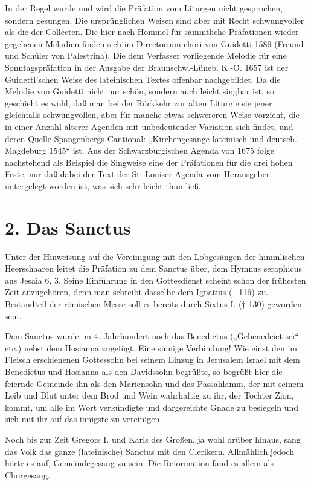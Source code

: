 In der Regel wurde und wird die Präfation vom Liturgen nicht gesprochen, sondern gesungen. Die ursprünglichen Weisen sind aber mit Recht schwungvoller als die der Collecten. Die hier nach Hommel für sämmtliche Präfationen wieder gegebenen Melodien finden sich im Directorium chori von Guidetti 1589 (Freund und Schüler von Palestrina). Die dem Verfasser vorliegende Melodie für eine Sonntagspräfation in der Ausgabe der Braunschw.-Lüneb. K.-O. 1657 ist der Guidetti’schen Weise des lateinischen Textes offenbar nachgebildet. Da die Melodie von Guidetti nicht nur schön, sondern auch leicht singbar ist, so geschieht es wohl, daß man bei der Rückkehr zur alten Liturgie sie jener gleichfalls schwungvollen, aber für manche etwas schwereren Weise vorzieht, die in einer Anzahl älterer Agenden mit unbedeutender Variation sich findet, und deren Quelle Spangenbergs Cantional: „Kirchengesänge lateinisch
und deutsch. Magdeburg 1545“ ist. Aus der Schwarzburgischen Agenda von 1675 folge nachstehend als Beispiel die Singweise eine der Präfationen für die drei hohen Feste, nur daß dabei der Text der St. Louiser Agenda vom Herausgeber untergelegt worden ist, was sich sehr leicht thun ließ.

\section{2. Das Sanctus}

Unter der Hinweisung auf die Vereinigung mit den Lobgesängen der himmlischen Heerschaaren leitet die Präfation zu dem Sanctus über, dem Hymnus seraphicus aus Jesaia 6, 3. Seine Einführung in den Gottesdienst scheint schon der frühesten Zeit anzugehören, denn man schreibt dasselbe dem Ignatius († 116) zu. Bestandteil der römischen Messe soll es bereits durch Sixtus I. († 130) geworden sein.

Dem Sanctus wurde im 4. Jahrhundert noch das Benedictus („Gebenedeiet sei“ etc.) nebst dem Hosianna zugefügt. Eine sinnige Verbindung! Wie einst den im Fleisch erschienenen Gottessohn bei seinem Einzug in Jerusalem Israel mit dem Benedictus und Hosianna als den Davidssohn begrüßte, so begrüßt hier die feiernde Gemeinde ihn als den Mariensohn und das Passahlamm, der mit seinem Leib und Blut unter dem Brod und Wein wahrhaftig zu ihr, der Tochter Zion, kommt, um alle im Wort verkündigte und dargereichte Gnade zu besiegeln und sich mit ihr auf das innigste zu vereinigen.

Noch bis zur Zeit Gregors I. und Karls des Großen, ja wohl drüber hinaus, sang das Volk das ganze (lateinische) Sanctus mit den Clerikern. Allmählich jedoch hörte es auf, Gemeindegesang zu sein. Die Reformation fand es allein als Chorgesang.

